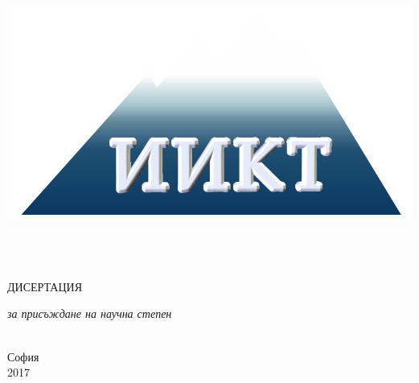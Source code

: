 \documentclass[14pt,bulgarian,singlespacing,headsepline,oneside,openany]{MastersDoctoralThesis}
\author{д-р инж. Тодор Димитров \textsc{Балабанов}}
\begin{document}
\frontmatter

\pagestyle{plain}


\begin{titlepage}
\begin{center}

\includegraphics[width=0.1\linewidth]{logo-iict-bg}

\vspace*{.06\textheight}


 

\HRule \\[0.4cm]

{\huge \bfseries \ttitle\par}\vspace{0.4cm}

\HRule \\[1.5cm]

\textsc{\Large ДИСЕРТАЦИЯ}\\[0.5cm] 
 
\vfill

\large \textit{за присъждане на научна степен\\  \degreename}\\[0.3cm]

 
\vfill
 
{\large София\\2017}
 
\vfill
\end{center}
\end{titlepage}
\end{document}
